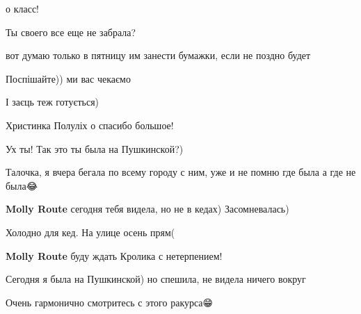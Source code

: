  
 
 
 
 

\qqSecCmt


о класс!

\begin{itemize} %

Ты своего все еще не забрала?


вот думаю только в пятницу им занести бумажки, если не поздно будет


Поспішайте)) ми вас чекаємо 🙂

І заєць теж готується)


Христинка Полуліх о спасибо большое!
\end{itemize} %


Ух ты! Так это ты была на Пушкинской?)

\begin{itemize} %

Талочка, я вчера бегала по всему городу с ним, уже и не помню где была а где не была😂

\textbf{Molly Route} сегодня тебя видела, но не в кедах) Засомневалась)


Холодно для кед. На улице осень прям(

\textbf{Molly Route} буду ждать Кролика с нетерпением!


Сегодня я была на Пушкинской) но спешила, не видела ничего вокруг
\end{itemize} %


Очень гармонично смотритесь с этого ракурса😁

